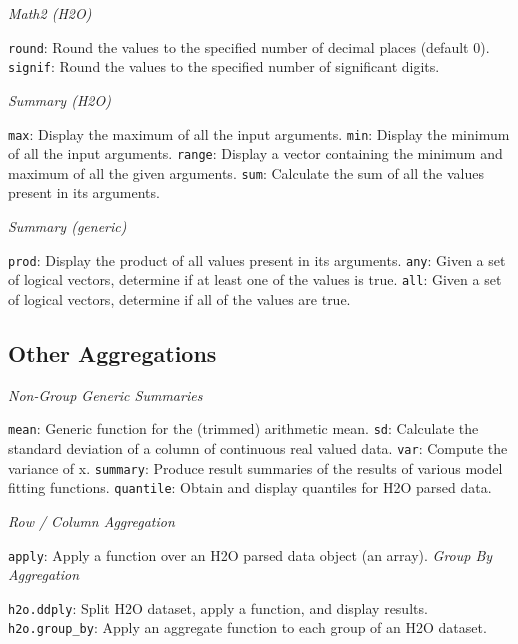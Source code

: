 {\emph{Math2 (H2O)}\par
{\texttt{round}}: Round the values to the specified number of decimal places (default 0). \newline
{\texttt{signif}}: Round the values to the specified number of significant digits.\newline

\emph{Summary (H2O)}\par
{\texttt{max}}: Display the maximum of all the input arguments. \newline
{\texttt{min}}: Display the minimum of all the input arguments. \newline
{\texttt{range}}: Display a vector containing the minimum and maximum of all the given arguments. \newline
{\texttt{sum}}: Calculate the sum of all the values present in its arguments.\newline

\emph{Summary (generic)}\par
{\texttt{prod}}: Display the product of all values present in its arguments. \newline
{\texttt{any}}: Given a set of logical vectors, determine if at least one of the values is true. \newline
{\texttt{all}}: Given a set of logical vectors, determine if all of the values are true.\newline

\subsection{Other Aggregations}

\emph{Non-Group Generic Summaries}\par
{\texttt{mean}}: Generic function for the (trimmed) arithmetic mean. \newline
{\texttt{sd}}: Calculate the standard deviation of a column of continuous real valued data. \newline
{\texttt{var}}: Compute the variance of x.\newline
{\texttt{summary}}: Produce result summaries of the results of various model fitting functions. \newline
{\texttt{quantile}}: Obtain and display quantiles for H2O parsed data.\newline

\emph{Row / Column Aggregation}\par
{\texttt{apply}: Apply a function over an H2O parsed data object (an array).\newline
\emph{Group By Aggregation}\par
{\texttt{h2o.ddply}}: Split H2O dataset, apply a function, and display results.\newline
{\texttt{h2o.group\_by}}: Apply an aggregate function to each group of an H2O dataset.\newline

}}
